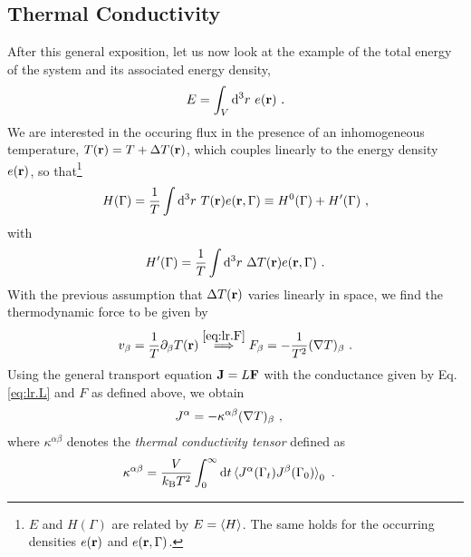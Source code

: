 \subsection{Thermal Conductivity}
\label{sec:Thermal.Conductivity}
After this general exposition, let us now look at the example of the total energy of the system and its associated energy density,
\begin{align}
	E = \int_V \d^3 r ~ e(\b r)~.
	\label{eq:lr.E}
\end{align}
We are interested in the occuring flux in the presence of an inhomogeneous temperature, $T({\bf r}) = T + \Delta T({\bf r})$, which couples linearly to the energy density  $e ({\bf r})$, so that\footnote{$E$ and $H(\Gamma)$ are related by $E = \braket{H}$. The same holds for the occurring densities $e({\bf r})$ and $e ({\bf r}, \Gamma)$.}
\begin{align}
	H (\Gamma) = \frac{1}{T} \int {\rm d}^3 r ~ T ({\bf r}) e({\bf r}, \Gamma) 
		\equiv H^0 (\Gamma) + H' (\Gamma)~,
\end{align}
with
\begin{align}
	H' (\Gamma) = \frac{1}{T} \int \d^3 r ~ \Delta T (\b r) e(\b r, \Gamma)~.
	\label{eq:lr.Hp.temp}
\end{align}
With the previous assumption that $\Delta T({\bf r})$ varies linearly in space, we find the thermodynamic force to be given by
\begin{align}
	v_\beta = \frac{1}{T} \partial_\beta T (\b r) 
		\stackrel{\eqref{eq:lr.F}}{\implies}
	F_\beta = - \frac{1}{T^2} (\b \nabla T)_\beta ~.
	\label{eq:lr.F.temp}
\end{align}
Using the general transport equation ${\bf J} = L {\bf F}$ with the conductance given by Eq.\,\eqref{eq:lr.L} and $F$ as defined above, we obtain
\begin{align}
	J^\alpha 
		&= - \kappa^{\alpha \beta} (\b \nabla T)_\beta~,
	\label{eq:lr.J.2}
\end{align}
where $\kappa^{\alpha \beta}$ denotes the \emph{thermal conductivity tensor} defined as
\begin{align}
	\kappa^{\alpha \beta}
		&=
		\frac{V}{k_{\rm B} T^2} \int_{0}^{\infty} 
		\d t \braket{J^\alpha (\Gamma_t) J^\beta (\Gamma_{0})}_0 ~.
	\label{eq:GreenKubo}
\end{align}

